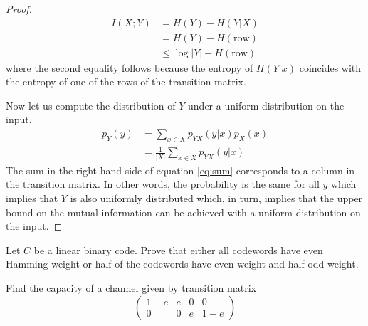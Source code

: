 \begin{proof}
\begin{align}
I(X;Y)&=H(Y)-H(Y|X)\\
      &=H(Y)-H(\text{row})\\
      &\leq \log|Y|-H(\text{row})
\end{align}
where the second equality follows because the entropy of $H(Y|x)$ coincides with the entropy of one of the rows of the transition matrix.

Now let us compute the distribution of $Y$ under a uniform distribution on the input. 
\begin{align}
p_Y(y)&=\sum_{x\in X}p_{YX}(y|x)p_X(x)\\
      &=\frac{1}{|X|}\sum_{x\in X}p_{YX}(y|x)\label{eq:sum}
\end{align}
The sum in the right hand side of equation \eqref{eq:sum} corresponds to a column in the transition matrix. In other words, the probability is the same for all $y$ which implies that $Y$ is also uniformly distributed which, in turn, implies that the upper bound on the mutual information can be achieved with a uniform distribution on the input. 
\end{proof}
\begin{exercise}
Let $C$ be a linear binary code. Prove that either all codewords have even Hamming weight or half of the codewords have even weight and half odd weight.
\end{exercise}
\begin{exercise}
Find the capacity of a channel given by transition matrix
\begin{equation}
\begin{pmatrix}
1-e&e&0&0\\
  0&0&e&1-e
\end{pmatrix}
\end{equation}
\end{exercise}
